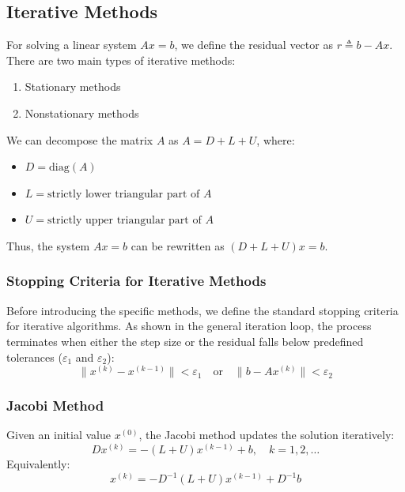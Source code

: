 \documentclass[12pt, a4paper]{article}
\theoremstyle{break}
\begin{document}
\subsection{Iterative Methods}
For solving a linear system $Ax = b$, we define the residual vector as $r \triangleq b - Ax$.
There are two main types of iterative methods:
\begin{enumerate}
    \item Stationary methods
    \item Nonstationary methods
\end{enumerate}

We can decompose the matrix $A$ as $A = D + L + U$, where:
\begin{itemize}
    \item $D = \text{diag}(A)$
    \item $L = \text{strictly lower triangular part of } A$
    \item $U = \text{strictly upper triangular part of } A$
\end{itemize}
Thus, the system $Ax = b$ can be rewritten as $(D + L + U)x = b$.
\subsubsection*{Stopping Criteria for Iterative Methods}
Before introducing the specific methods, we define the standard stopping criteria for iterative algorithms.
As shown in the general iteration loop, the process terminates when either the step size or the residual falls below predefined tolerances ($\varepsilon_1$ and $\varepsilon_2$):
\begin{equation*}
    \|x^{(k)} - x^{(k-1)}\| < \varepsilon_1 \quad \text{or} \quad \|b - Ax^{(k)}\| < \varepsilon_2
\end{equation*}

\subsubsection{Jacobi Method}
Given an initial value $x^{(0)}$, the Jacobi method updates the solution iteratively:
\begin{equation*}
    D x^{(k)} = -(L + U)x^{(k-1)} + b, \quad k = 1, 2, \dots
\end{equation*}
Equivalently:
\begin{equation*}
    x^{(k)} = -D^{-1}(L + U)x^{(k-1)} + D^{-1}b
\end{equation*}
\end{document}
